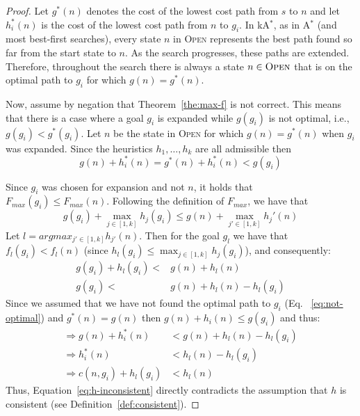 \documentclass{aicom2e}
\newcommand{\astar}{A$^*$}
\newcommand{\kastar}{kA$^*$}
\newcommand{\open}{\textsc{Open}}
\begin{document}
\begin{proof}
Let $g^*(n)$ denotes the cost of the lowest cost path from $s$ to $n$
and let $h^*_i(n)$ is the cost of the lowest cost path from $n$ to $g_i$. 
In \kastar{}, as in \astar{} (and most best-first searches), 
every state $n$ in \open{} represents the best path found so far from the start state to $n$. 
As the search progresses, these paths are extended. 
Therefore, throughout the search there is always a state $n\in \open{}$ 
that is on the optimal path to $g_i$ for which $g(n)=g^*(n)$. 

Now, assume by negation that Theorem~\ref{the:max-f} is not correct. This means that
there is a case where a goal $g_i$ is expanded while $g(g_i)$ is not optimal, 
i.e., $g(g_i)<g^*(g_i)$. Let $n$ be the state in \open{} for which $g(n)=g^*(n)$ 
when $g_i$ was expanded. Since the heuristics $h_1,\ldots, h_k$ are all admissible
then 
 \begin{equation}
     g(n)+h_i^*(n) = g^*(n)+h_i^*(n) < g(g_i)
    \label{eq:not-optimal}
 \end{equation}

Since $g_i$ was chosen for expansion and not $n$, it holds that $ F_{max}(g_i) \leq F_{max}(n) $. 
Following the definition of $F_{max}$, we have that
 \begin{equation}
     g(g_i) + \max_{j\in [1,k]} h_{j}(g_i) \leq g(n)+\max_{j'\in [1,k]} h_j'(n)
 \end{equation}
 Let $l=argmax_{j'\in [1,k]} h_{j'}(n)$.
 Then for the goal $g_l$ we have that
 $f_l(g_i) < f_l(n)$ (since $h_l(g_i) \leq \max_{j\in [1,k]} h_{j}(g_i)$), and consequently:
 \begin{align}
     g(g_i)+h_l(g_i) < & g(n)+h_l(n) \\
     g(g_i) < & g(n)+h_l(n) - h_l(g_i)
 \end{align}
Since we assumed that we have not found the optimal path to $g_i$ (Eq.~ \ref{eq:not-optimal}) 
and $g^*(n)=g(n)$ then
$g(n)+h_i(n)\leq g(g_i)$ and thus:
\begin{align}
\Rightarrow g(n)+h^*_i(n)  & < g(n)+h_l(n) - h_l(g_i)\\
\Rightarrow h^*_i(n)  & < h_l(n) - h_l(g_i)\\
\Rightarrow c(n,g_i) + h_l(g_i) & < h_l(n) \label{eq:h-inconsistent}
\end{align}
Thus, Equation~\ref{eq:h-inconsistent} directly contradicts the assumption
that $h$ is consistent (see Definition~\ref{def:consistent}).
\end{proof}
\end{document}
